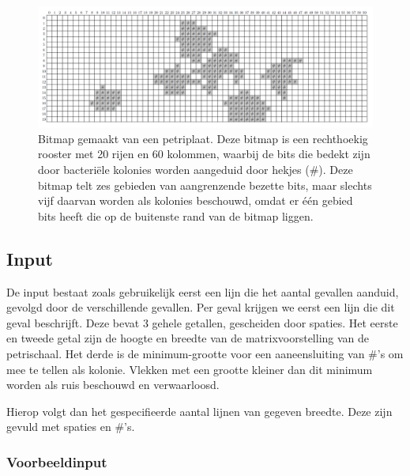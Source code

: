 \begin{figure}[H]
  \begin{center}
    \centerline{\includegraphics[scale=0.30]{koloniepikker/colony_bitmap.png}}
    \caption{Bitmap gemaakt van een petriplaat. Deze bitmap is een rechthoekig
        rooster met 20 rijen en 60 kolommen, waarbij de bits die bedekt zijn
        door bacteri\"ele kolonies worden aangeduid door hekjes (\#). Deze
        bitmap telt zes gebieden van aangrenzende bezette bits, maar slechts
        vijf daarvan worden als kolonies beschouwd, omdat er \'e\'en gebied bits
        heeft die op de buitenste rand van de bitmap liggen.}
  \end{center}
\end{figure}

\subsection*{Input}

De input bestaat zoals gebruikelijk eerst een lijn die het aantal gevallen
aanduid, gevolgd door de verschillende gevallen. Per geval krijgen we eerst een
lijn die dit geval beschrijft. Deze bevat 3 gehele getallen, gescheiden door
spaties. Het eerste en tweede getal zijn de hoogte en breedte van de
matrixvoorstelling van de petrischaal. Het derde is de minimum-grootte voor een
aaneensluiting van \#'s om mee te tellen als kolonie. Vlekken met een grootte
kleiner dan dit minimum worden als ruis beschouwd en verwaarloosd.

Hierop volgt dan het gespecifieerde aantal lijnen van gegeven breedte. Deze zijn
gevuld met spaties en \#'s.

\subsubsection*{Voorbeeldinput}

